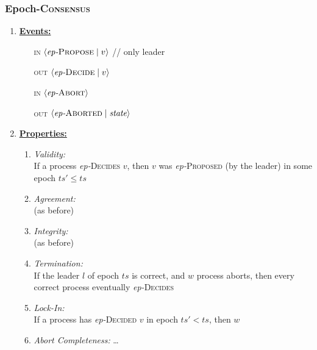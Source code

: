 \documentclass{article}
\begin{document}
\begin{adjustwidth}{2em}{2em}
\begin{adjustwidth}{2em}{2em}
			\subsubsection{Epoch-\textsc{Consensus}}
			\begin{enumerate}[]
				\item \textbf{\underline{Events:}}
				\begin{enumerate}
					\item[\textsc{in}] $\langle \textit{ep-}\textsc{Propose} \mid v \rangle$ \hspace{2cm} // only leader
					\item[\textsc{out}] $\langle \textit{ep-}\textsc{Decide} \mid v \rangle$
					\item[\textsc{in}] $\langle \textit{ep-}\textsc{Abort}\rangle$
					\item[\textsc{out}] $\langle \textit{ep-}\textsc{Aborted} \mid \textit{state} \rangle$
				\end{enumerate}
				\item \textbf{\underline{Properties:}}
				\begin{enumerate}[]
					\item \textit{Validity:} \\
					If a process \textit{ep-}\textsc{Decides} $v$, then $v$ was \textit{ep-}\textsc{Proposed} (by the leader) in some epoch $ts' \leq ts$
					\item \textit{Agreement:} \\
					(as before)
					\item \textit{Integrity:} \\
					(as before)
					\item \textit{Termination:} \\
					If the leader $l$ of epoch $ts$ is correct, and $w$ process aborts, then every correct process eventually \textit{ep-}\textsc{Decides}
					\item \textit{Lock-In:} \\
						If a process has \textit{ep-}\textsc{Decided} $v$ in epoch $ts' < ts$, then $w$
					\item \textit{Abort Completeness:} \ldots	
				\end{enumerate}
			\end{enumerate}
		\end{adjustwidth}

\end{adjustwidth}
\end{document}
